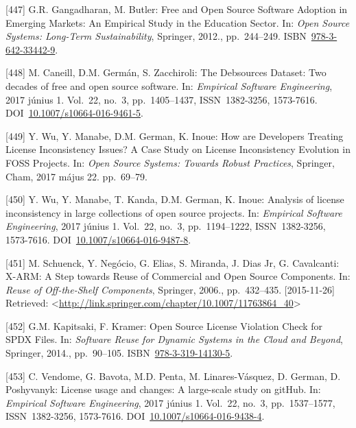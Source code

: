 \documentclass[12pt,magyar,a4paper,oneside]{scrreprt}
\newenvironment{cslreferences}%
  {}%
  {\par}
\begin{document}
\begin{cslreferences}
\leavevmode\hypertarget{ref-gangadharan_free_2012}{}%
{[}447{]} G.R. Gangadharan, M. Butler: Free and Open Source Software
Adoption in Emerging Markets: An Empirical Study in the Education
Sector. In: \emph{Open Source Systems: Long-Term Sustainability},
Springer, 2012., pp.~244--249.
ISBN~\href{https://worldcat.org/isbn/978-3-642-33442-9}{978-3-642-33442-9}.

\leavevmode\hypertarget{ref-caneill_debsources_2017}{}%
{[}448{]} M. Caneill, D.M. Germán, S. Zacchiroli: The Debsources
Dataset: Two decades of free and open source software. In:
\emph{Empirical Software Engineering}, 2017 június 1. Vol.~22, no.~3,
pp.~1405--1437, ISSN~1382-3256, 1573-7616.
DOI~\href{https://doi.org/10.1007/s10664-016-9461-5}{10.1007/s10664-016-9461-5}.

\leavevmode\hypertarget{ref-wu_how_2017}{}%
{[}449{]} Y. Wu, Y. Manabe, D.M. German, K. Inoue: How are Developers
Treating License Inconsistency Issues? A Case Study on License
Inconsistency Evolution in FOSS Projects. In: \emph{Open Source Systems:
Towards Robust Practices}, Springer, Cham, 2017 május 22. pp.~69--79.

\leavevmode\hypertarget{ref-wu_analysis_2017}{}%
{[}450{]} Y. Wu, Y. Manabe, T. Kanda, D.M. German, K. Inoue: Analysis of
license inconsistency in large collections of open source projects. In:
\emph{Empirical Software Engineering}, 2017 június 1. Vol.~22, no.~3,
pp.~1194--1222, ISSN~1382-3256, 1573-7616.
DOI~\href{https://doi.org/10.1007/s10664-016-9487-8}{10.1007/s10664-016-9487-8}.

\leavevmode\hypertarget{ref-schuenck_x-arm_2006}{}%
{[}451{]} M. Schuenck, Y. Negócio, G. Elias, S. Miranda, J. Dias Jr, G.
Cavalcanti: X-ARM: A Step towards Reuse of Commercial and Open Source
Components. In: \emph{Reuse of Off-the-Shelf Components}, Springer,
2006., pp.~432--435. {[}2015-11-26{]} Retrieved:
\textless{}\url{http://link.springer.com/chapter/10.1007/11763864_40}\textgreater{}

\leavevmode\hypertarget{ref-kapitsaki_open_2014}{}%
{[}452{]} G.M. Kapitsaki, F. Kramer: Open Source License Violation Check
for SPDX Files. In: \emph{Software Reuse for Dynamic Systems in the
Cloud and Beyond}, Springer, 2014., pp.~90--105.
ISBN~\href{https://worldcat.org/isbn/978-3-319-14130-5}{978-3-319-14130-5}.

\leavevmode\hypertarget{ref-vendome_license_2017}{}%
{[}453{]} C. Vendome, G. Bavota, M.D. Penta, M. Linares-Vásquez, D.
German, D. Poshyvanyk: License usage and changes: A large-scale study on
gitHub. In: \emph{Empirical Software Engineering}, 2017 június 1.
Vol.~22, no.~3, pp.~1537--1577, ISSN~1382-3256, 1573-7616.
DOI~\href{https://doi.org/10.1007/s10664-016-9438-4}{10.1007/s10664-016-9438-4}.


\end{cslreferences}
\end{document}
